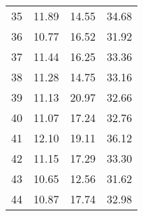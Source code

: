 \begin{table}[h!]
\begin{tabular}{cccc}
35 & 11.89 & 14.55 & 34.68 \\ 
36 & 10.77 & 16.52 & 31.92 \\ 
37 & 11.44 & 16.25 & 33.36 \\ 
38 & 11.28 & 14.75 & 33.16 \\ 
39 & 11.13 & 20.97 & 32.66 \\ 
40 & 11.07 & 17.24 & 32.76 \\ 
41 & 12.10 & 19.11 & 36.12 \\ 
42 & 11.15 & 17.29 & 33.30 \\ 
43 & 10.65 & 12.56 & 31.62 \\ 
44 & 10.87 & 17.74 & 32.98 \\ 
\hline 
\end{tabular}
\end{table}